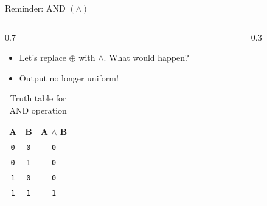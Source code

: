 \documentclass[aspectratio=169, lualatex, handout]{beamer}
\begin{document}
\begin{frame}{Reminder: AND $(\land)$}
	\begin{columns}[c]
		\begin{column}{0.7\textwidth}
			\begin{itemize}[<+->]
				\item Let's replace $\oplus$ with $\land$. What would happen?
				\item Output no longer uniform!
			\end{itemize}
			\begin{table}
				\centering
				\begin{tabular}{|c|c|c|}
					\hline
					\textbf{A} & \textbf{B} & \textbf{A $\land$ B} \\
					\hline
					\texttt{0} & \texttt{0} & \texttt{0}           \\
					\hline
					\texttt{0} & \texttt{1} & \texttt{0}           \\
					\hline
					\texttt{1} & \texttt{0} & \texttt{0}           \\
					\hline
					\texttt{1} & \texttt{1} & \texttt{1}           \\
					\hline
				\end{tabular}
				\caption{Truth table for AND operation}
			\end{table}
		\end{column}
		\begin{column}{0.3\textwidth}
		\end{column}
	\end{columns}
\end{frame}
\end{document}
